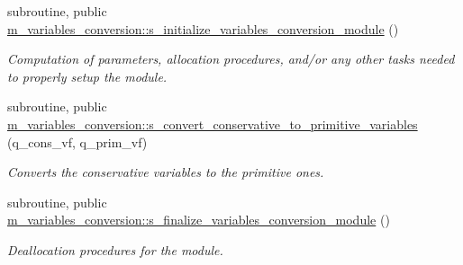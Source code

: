 \begin{DoxyCompactItemize}
subroutine, public \hyperlink{namespacem__variables__conversion_ac006af9a5403b2fdad7f81ce0a67ecec}{m\+\_\+variables\+\_\+conversion\+::s\+\_\+initialize\+\_\+variables\+\_\+conversion\+\_\+module} ()
\begin{DoxyCompactList}\small\item\em Computation of parameters, allocation procedures, and/or any other tasks needed to properly setup the module. \end{DoxyCompactList}\item 
subroutine, public \hyperlink{namespacem__variables__conversion_abecd489e8c769f12646d2647fab7dd53}{m\+\_\+variables\+\_\+conversion\+::s\+\_\+convert\+\_\+conservative\+\_\+to\+\_\+primitive\+\_\+variables} (q\+\_\+cons\+\_\+vf, q\+\_\+prim\+\_\+vf)
\begin{DoxyCompactList}\small\item\em Converts the conservative variables to the primitive ones. \end{DoxyCompactList}\item 
subroutine, public \hyperlink{namespacem__variables__conversion_a6a3f90e69ef4dea304495d0f7c068de2}{m\+\_\+variables\+\_\+conversion\+::s\+\_\+finalize\+\_\+variables\+\_\+conversion\+\_\+module} ()
\begin{DoxyCompactList}\small\item\em Deallocation procedures for the module. \end{DoxyCompactList}\end{DoxyCompactItemize}
